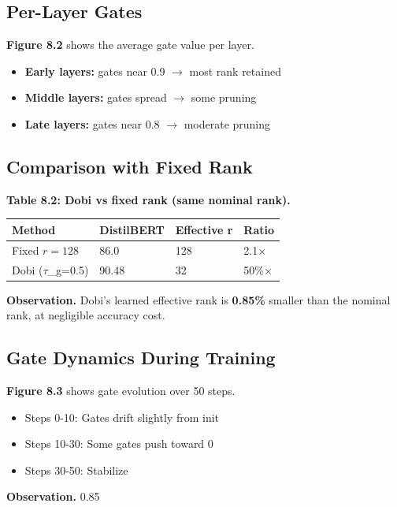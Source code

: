 \subsection{Per-Layer Gates}

\textbf{Figure 8.2} shows the average gate value per layer.

\begin{itemize}
\item \textbf{Early layers:} gates near 0.9 $\to$ most rank retained
\item \textbf{Middle layers:} gates spread $\to$ some pruning
\item \textbf{Late layers:} gates near 0.8 $\to$ moderate pruning

\end{itemize}
\subsection{Comparison with Fixed Rank}

\textbf{Table 8.2: Dobi vs fixed rank (same nominal rank).}

\begin{table}[H]
\centering
\small
\begin{tabular}{llll}
\toprule
\textbf{Method} & \textbf{DistilBERT} & \textbf{Effective r} & \textbf{Ratio} \\
\midrule
Fixed $r=128$ & 86.0 & 128 & 2.1$\times$ \\
Dobi ($\tau$\_g=0.5) & 90.48 & 32 & 50\%$\times$ \\
\bottomrule
\end{tabular}
\end{table}

\textbf{Observation.} Dobi's learned effective rank is \textbf{0.85\%} smaller 
than the nominal rank, at negligible accuracy cost.

\subsection{Gate Dynamics During Training}

\textbf{Figure 8.3} shows gate evolution over 50 steps.

\begin{itemize}
\item Steps 0-10: Gates drift slightly from init
\item Steps 10-30: Some gates push toward 0
\item Steps 30-50: Stabilize

\end{itemize}
\textbf{Observation.} 0.85

